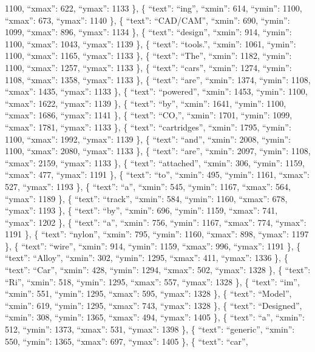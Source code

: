 \documentclass[
]{article}
\begin{document}
1100, ``xmax'': 622, ``ymax'': 1133 \}, \{ ``text'': ``ing'', ``xmin'':
614, ``ymin'': 1100, ``xmax'': 673, ``ymax'': 1140 \}, \{ ``text'':
``CAD/CAM'', ``xmin'': 690, ``ymin'': 1099, ``xmax'': 896, ``ymax'':
1134 \}, \{ ``text'': ``design'', ``xmin'': 914, ``ymin'': 1100,
``xmax'': 1043, ``ymax'': 1139 \}, \{ ``text'': ``tools.'', ``xmin'':
1061, ``ymin'': 1100, ``xmax'': 1165, ``ymax'': 1133 \}, \{ ``text'':
``The'', ``xmin'': 1182, ``ymin'': 1100, ``xmax'': 1257, ``ymax'': 1133
\}, \{ ``text'': ``cars'', ``xmin'': 1274, ``ymin'': 1108, ``xmax'':
1358, ``ymax'': 1133 \}, \{ ``text'': ``are'', ``xmin'': 1374, ``ymin'':
1108, ``xmax'': 1435, ``ymax'': 1133 \}, \{ ``text'': ``powered'',
``xmin'': 1453, ``ymin'': 1100, ``xmax'': 1622, ``ymax'': 1139 \}, \{
``text'': ``by'', ``xmin'': 1641, ``ymin'': 1100, ``xmax'': 1686,
``ymax'': 1141 \}, \{ ``text'': ``CO,'', ``xmin'': 1701, ``ymin'': 1099,
``xmax'': 1781, ``ymax'': 1133 \}, \{ ``text'': ``cartridges'',
``xmin'': 1795, ``ymin'': 1100, ``xmax'': 1992, ``ymax'': 1139 \}, \{
``text'': ``and'', ``xmin'': 2008, ``ymin'': 1100, ``xmax'': 2080,
``ymax'': 1133 \}, \{ ``text'': ``are'', ``xmin'': 2097, ``ymin'': 1108,
``xmax'': 2159, ``ymax'': 1133 \}, \{ ``text'': ``attached'', ``xmin'':
306, ``ymin'': 1159, ``xmax'': 477, ``ymax'': 1191 \}, \{ ``text'':
``to'', ``xmin'': 495, ``ymin'': 1161, ``xmax'': 527, ``ymax'': 1193 \},
\{ ``text'': ``a'', ``xmin'': 545, ``ymin'': 1167, ``xmax'': 564,
``ymax'': 1189 \}, \{ ``text'': ``track'', ``xmin'': 584, ``ymin'':
1160, ``xmax'': 678, ``ymax'': 1193 \}, \{ ``text'': ``by'', ``xmin'':
696, ``ymin'': 1159, ``xmax'': 741, ``ymax'': 1202 \}, \{ ``text'':
``a'', ``xmin'': 756, ``ymin'': 1167, ``xmax'': 774, ``ymax'': 1191 \},
\{ ``text'': ``nylon'', ``xmin'': 795, ``ymin'': 1160, ``xmax'': 898,
``ymax'': 1197 \}, \{ ``text'': ``wire'', ``xmin'': 914, ``ymin'': 1159,
``xmax'': 996, ``ymax'': 1191 \}, \{ ``text'': ``Alloy'', ``xmin'': 302,
``ymin'': 1295, ``xmax'': 411, ``ymax'': 1336 \}, \{ ``text'': ``Car'',
``xmin'': 428, ``ymin'': 1294, ``xmax'': 502, ``ymax'': 1328 \}, \{
``text'': ``Ri'', ``xmin'': 518, ``ymin'': 1295, ``xmax'': 557,
``ymax'': 1328 \}, \{ ``text'': ``im'', ``xmin'': 551, ``ymin'': 1295,
``xmax'': 595, ``ymax'': 1328 \}, \{ ``text'': ``Model'', ``xmin'': 619,
``ymin'': 1295, ``xmax'': 743, ``ymax'': 1328 \}, \{ ``text'':
``Designed'', ``xmin'': 308, ``ymin'': 1365, ``xmax'': 494, ``ymax'':
1405 \}, \{ ``text'': ``a'', ``xmin'': 512, ``ymin'': 1373, ``xmax'':
531, ``ymax'': 1398 \}, \{ ``text'': ``generic'', ``xmin'': 550,
``ymin'': 1365, ``xmax'': 697, ``ymax'': 1405 \}, \{ ``text'': ``car'',
\end{document}
